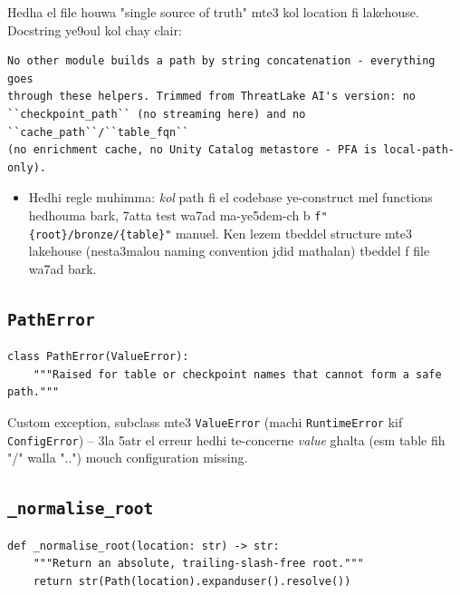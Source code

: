 \documentclass[11pt,a4paper]{report}
\DeclareRobustCommand{\code}[1]{\texttt{#1}}
\begin{document}
Hedha el file houwa "single source of truth" mte3 kol location fi lakehouse.
Docstring ye9oul kol chay clair:

\begin{lstlisting}[style=pystyle]
No other module builds a path by string concatenation - everything goes
through these helpers. Trimmed from ThreatLake AI's version: no
``checkpoint_path`` (no streaming here) and no ``cache_path``/``table_fqn``
(no enrichment cache, no Unity Catalog metastore - PFA is local-path-only).
\end{lstlisting}

\begin{itemize}
  \item Hedhi regle muhimma: \emph{kol} path fi el codebase ye-construct mel
        functions hedhouma bark, 7atta test wa7ad ma-ye5dem-ch b
        \code{f"\{root\}/bronze/\{table\}"} manuel. Ken lezem tbeddel structure
        mte3 lakehouse (nesta3malou naming convention jdid mathalan) tbeddel
        f file wa7ad bark.
\end{itemize}

\subsection{\code{PathError}}

\begin{lstlisting}[style=pystyle]
class PathError(ValueError):
    """Raised for table or checkpoint names that cannot form a safe path."""
\end{lstlisting}

Custom exception, subclass mte3 \code{ValueError} (machi \code{RuntimeError}
kif \code{ConfigError}) -- 3la 5atr el erreur hedhi te-concerne \emph{value}
ghalta (esm table fih "/" walla "..") mouch configuration missing.

\subsection{\code{\_normalise\_root}}

\begin{lstlisting}[style=pystyle]
def _normalise_root(location: str) -> str:
    """Return an absolute, trailing-slash-free root."""
    return str(Path(location).expanduser().resolve())
\end{lstlisting}
\end{document}
